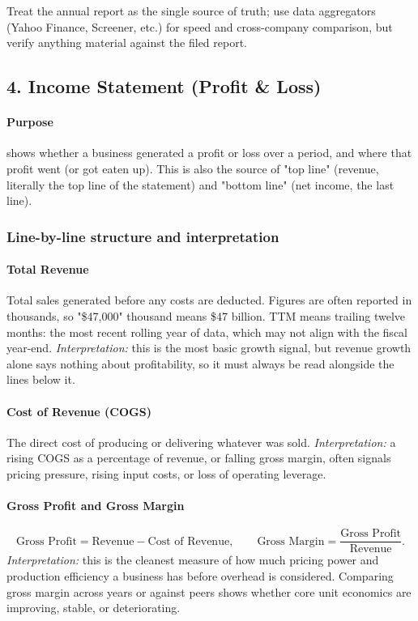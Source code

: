 \documentclass[12pt,openany]{book}
\begin{document}
Treat the annual report as the single source of truth; use data aggregators (Yahoo Finance, Screener, etc.) for speed and cross-company comparison, but verify anything material against the filed report.

\subsection{4. Income Statement (Profit \& Loss)}

\paragraph{Purpose} shows whether a business generated a profit or loss over a period, and where that profit went (or got eaten up). This is also the source of "top line" (revenue, literally the top line of the statement) and "bottom line" (net income, the last line).

\subsubsection{Line-by-line structure and interpretation}

\paragraph{Total Revenue} Total sales generated before any costs are deducted. Figures are often reported in thousands, so "\$47,000" thousand means \$47 billion. TTM means trailing twelve months: the most recent rolling year of data, which may not align with the fiscal year-end. \emph{Interpretation:} this is the most basic growth signal, but revenue growth alone says nothing about profitability, so it must always be read alongside the lines below it.

\paragraph{Cost of Revenue (COGS)} The direct cost of producing or delivering whatever was sold. \emph{Interpretation:} a rising COGS as a percentage of revenue, or falling gross margin, often signals pricing pressure, rising input costs, or loss of operating leverage.

\paragraph{Gross Profit and Gross Margin}
\begin{equation*}
    \text{Gross Profit} = \text{Revenue} - \text{Cost of Revenue}, \qquad
    \text{Gross Margin} = \frac{\text{Gross Profit}}{\text{Revenue}}.
\end{equation*}
\emph{Interpretation:} this is the cleanest measure of how much pricing power and production efficiency a business has before overhead is considered. Comparing gross margin across years or against peers shows whether core unit economics are improving, stable, or deteriorating.
\end{document}

